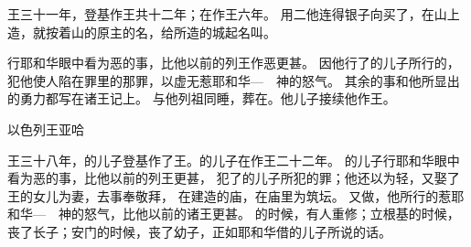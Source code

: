 {王{}三十一年，{}登基作{}王共十二年；在{}作王六年。
用二他连得银子向{}买了{}，在山上造{}，就按着山的原主{}的名，给所造的城起名叫{}。
\par }{\PP {}行耶和华眼中看为恶的事，比他以前的列王作恶更甚。
因他行了{}的儿子{}所行的，犯他使{}人陷在罪里的那罪，以虚无{}惹耶和华—{}　神的怒气。
其余的事和他所显出的勇力都写在{}诸王记上。
与他列祖同睡，葬在{}。他儿子{}接续他作王。
\par }{\SH 以色列王亚哈
\par }{\PP {}王{}三十八年，{}的儿子{}登基作了{}王。{}的儿子{}在{}作{}王二十二年。
的儿子{}行耶和华眼中看为恶的事，比他以前的列王更甚，
犯了{}的儿子{}所犯的罪；他还以为轻，又娶了{}王{}的女儿{}为妻，去事奉敬拜{}，
在{}建造{}的庙，在庙里为{}筑坛。
又做{}，他所行的惹耶和华—{}　神的怒气，比他以前的{}诸王更甚。
的时候，有{}人{}重修{}{}；立根基的时候，丧了长子{}；安门的时候，丧了幼子{}，正如耶和华借{}的儿子{}所说的话。

}
